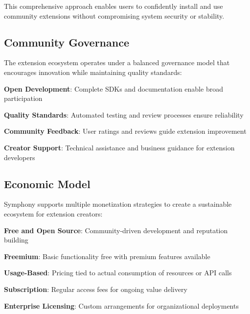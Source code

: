 This comprehensive approach enables users to confidently install and use community extensions without compromising system security or stability.

\subsection*{Community Governance}

The extension ecosystem operates under a \textcolor{brandAccent}{balanced governance model} that encourages innovation while maintaining quality standards:

\begin{infobox}[title=Governance Principles]
\begin{compactlist}
    \item \textbf{Open Development}: Complete SDKs and documentation enable broad participation
    \item \textbf{Quality Standards}: Automated testing and review processes ensure reliability
    \item \textbf{Community Feedback}: User ratings and reviews guide extension improvement
    \item \textbf{Creator Support}: Technical assistance and business guidance for extension developers
\end{compactlist}
\end{infobox}

\subsection*{Economic Model}

Symphony supports multiple monetization strategies to create a sustainable ecosystem for extension creators:

\begin{compactlist}
    \item \textbf{Free and Open Source}: Community-driven development and reputation building
    \item \textbf{Freemium}: Basic functionality free with premium features available
    \item \textbf{Usage-Based}: Pricing tied to actual consumption of resources or API calls
    \item \textbf{Subscription}: Regular access fees for ongoing value delivery
    \item \textbf{Enterprise Licensing}: Custom arrangements for organizational deployments
\end{compactlist}

